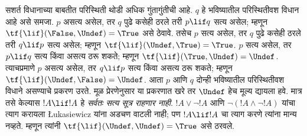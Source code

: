 \documentclass[../../../include/open-logic-section]{subfiles}
\begin{document}
सशर्त विधानाच्या बाबतीत परिस्थिती थोडी अधिक गुंतागुंतीची आहे.
$q$ हे भविष्यातील परिस्थितीवश विधान आहे असे समजा. $p$ असत्य
असेल, तर $q$ पुढे कसेही ठरले तरी $p \lif q$ सत्य असेल; म्हणून
$\tf{\lif}(\False, \Undef) = \True$ असे ठेवावे. तसेच $p$
सत्य असेल, तर $q$ पुढे कसेही ठरले तरी $q \lif p$ सत्य असेल;
म्हणून $\tf{\lif}(\Undef, \True) = \True$. $p$ सत्य असेल,
तर $p \lif q$ सत्य किंवा असत्य ठरू शकते; म्हणून
$\tf{\lif}(\True, \Undef) = \Undef$. त्याचप्रमाणे $p$
असत्य असेल, तर $q \lif p$ सत्य किंवा असत्य ठरू शकते;
म्हणून $\tf{\lif}(\Undef, \False) = \Undef$. आता $p$
आणि $q$ दोन्ही भविष्यातील परिस्थितीवश विधाने असण्याचे
प्रकरण उरते. मूळ प्रेरणेनुसार या प्रकरणात खरे तर $\Undef$
हेच मूल्य द्यायला हवे. मात्र तसे केल्यास $!A \lif !A$
हे \emph{सर्वतः सत्य सूत्र राहणार नाही}. $!A \lor \lnot !A$
आणि $\lnot(!A \land \lnot !A)$ यांचा त्याग करायला
\L ukasiewicz यांना अडचण वाटली नाही; पण $!A \lif !A$
चा त्याग करणे त्यांना मान्य नव्हते. म्हणून त्यांनी
$\tf{\lif}(\Undef, \Undef) = \True$ असे ठरवले.
\end{document}
